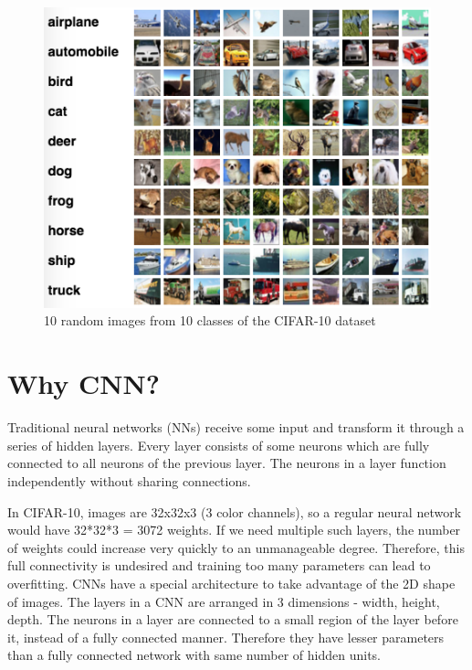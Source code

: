 \documentclass[10pt,twocolumn,letterpaper]{article}
\begin{document}
\begin{figure}[hbt]
  \includegraphics[scale=0.50]{cifar-dataset}
  \caption{10 random images from 10 classes of the CIFAR-10 dataset}
\end{figure}

\section{Why CNN?}
Traditional neural networks (NNs) receive some input and transform it through a series of hidden layers. Every layer consists of some neurons which are fully connected to all neurons of the previous layer. The neurons in a layer function independently without sharing connections.

In CIFAR-10, images are 32x32x3 (3 color channels), so a regular neural network would have 32*32*3 = 3072 weights. If we need multiple such layers, the number of weights could increase very quickly to an unmanageable degree. Therefore, this full connectivity is undesired and training too many parameters can lead to overfitting. CNNs have a special architecture to take advantage of the 2D shape of images. The layers in a CNN are arranged in 3 dimensions - width, height, depth. The neurons in a layer are connected to a small region of the layer before it, instead of a fully connected manner. Therefore they have lesser parameters than a fully connected network with same number of hidden units.
\end{document}
